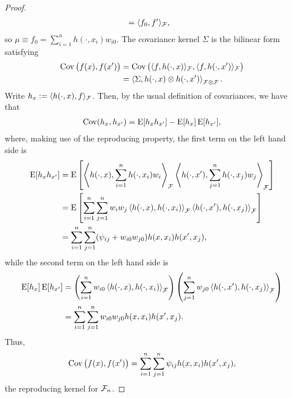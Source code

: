 \begin{proof}
\begin{align*}
    &= \langle f_0,f' \rangle_{{\mathcal F}},
  \end{align*}
  so $\mu \equiv f_0 = \sum_{i=1}^n h(\cdot,x_i)w_{i0}$. 
  The covariance kernel $\Sigma$ is the bilinear form satisfying
  \begin{align*}
    \operatorname{Cov}\big(f(x),f(x')\big) 
    &= \operatorname{Cov}\big(\langle f,h(\cdot,x)\rangle_{{\mathcal F}}, \langle f,h(\cdot,x')\rangle_{{\mathcal F}} \big) \\
    &= \left\langle \Sigma, h(\cdot,x) \otimes h(\cdot,x') \right\rangle_{{\mathcal F} \otimes {\mathcal F}}.
  \end{align*}
  Write $h_{x} := \langle h(\cdot,x),f \rangle_{{\mathcal F}}$. 
  Then, by the usual definition of covariances, we have that 
  \begin{align*}
    \operatorname{Cov}(h_x,h_{x'}) = \operatorname{E}[h_xh_{x'}] - \operatorname{E}[h_x]\operatorname{E}[h_{x'}],
  \end{align*}
  where, making use of the reproducing property, the first term on the left hand side is
  \begin{align*}
    \operatorname{E}[h_xh_{x'}] 
    &= \operatorname{E} \left[ 
    \left\langle h(\cdot,x), \sum_{i=1}^n h(\cdot,x_i)w_i \right\rangle_{{\mathcal F}} 
    \left\langle h(\cdot,x'), \sum_{j=1}^n h(\cdot,x_j)w_j \right\rangle_{{\mathcal F}} 
    \right] \\
    &= \operatorname{E} \left[ 
    \sum_{i=1}^n\sum_{j=1}^n w_iw_j \left\langle  h(\cdot,x), h(\cdot,x_i) \right\rangle_{{\mathcal F}} 
     \left\langle h(\cdot,x'), h(\cdot,x_j)\right\rangle_{{\mathcal F}} 
    \right] \\
    &= \sum_{i=1}^n\sum_{j=1}^n (\psi_{ij} + w_{i0}w_{j0}) h(x,x_i) h(x',x_j),
  \end{align*}
  while the second term on the left hand side is
  \begin{align*}
    \operatorname{E}[h_x]\operatorname{E}[h_{x'}]
    &= \left( \sum_{i=1}^n w_{i0} \left\langle  h(\cdot,x), h(\cdot,x_i)  \right\rangle_{{\mathcal F}} \right)
    \left( \sum_{j=1}^n w_{j0} \left\langle  h(\cdot,x'), h(\cdot,x_j)  \right\rangle_{{\mathcal F}} \right) \\
    &= \sum_{i=1}^n \sum_{j=1}^n w_{i0}w_{j0} h(x,x_i)h(x',x_j).
  \end{align*}  
  Thus,
  \[
    \operatorname{Cov}\big( f(x),f(x') \big) = \sum_{i=1}^n\sum_{j=1}^n \psi_{ij} h(x,x_i) h(x',x_j),
  \]
  the reproducing kernel for ${\mathcal F}_n$.
\end{proof}


